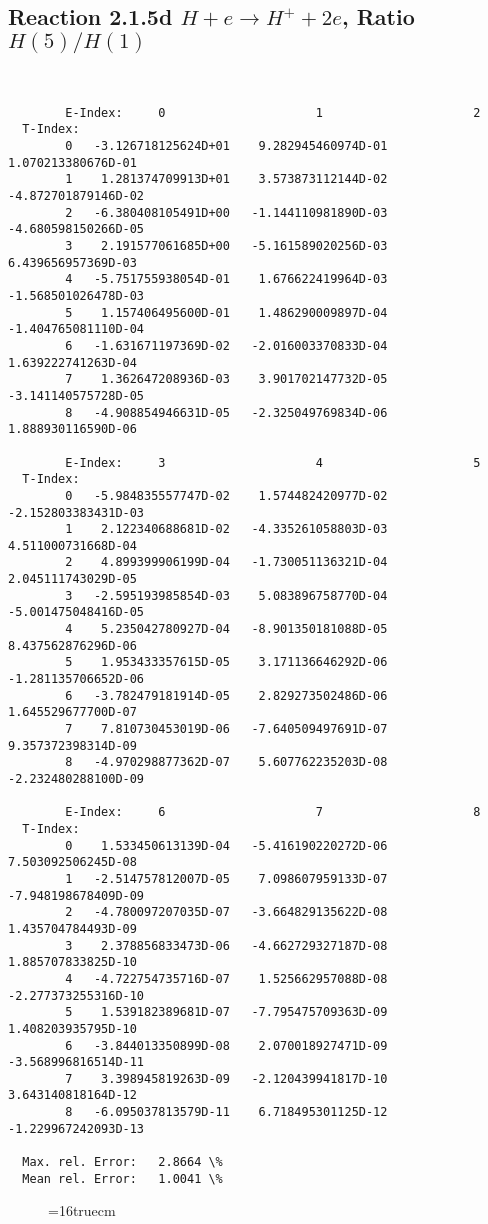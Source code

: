 \documentclass[12pt,dvipdfmx]{article}
\begin{document}
\newpage
\subsection{
Reaction 2.1.5d  $H + e \rightarrow H^+ + 2e$, Ratio $H(5)/H(1)$
}


\begin{small}\begin{verbatim}


        E-Index:     0                     1                     2
  T-Index:
        0   -3.126718125624D+01    9.282945460974D-01    1.070213380676D-01
        1    1.281374709913D+01    3.573873112144D-02   -4.872701879146D-02
        2   -6.380408105491D+00   -1.144110981890D-03   -4.680598150266D-05
        3    2.191577061685D+00   -5.161589020256D-03    6.439656957369D-03
        4   -5.751755938054D-01    1.676622419964D-03   -1.568501026478D-03
        5    1.157406495600D-01    1.486290009897D-04   -1.404765081110D-04
        6   -1.631671197369D-02   -2.016003370833D-04    1.639222741263D-04
        7    1.362647208936D-03    3.901702147732D-05   -3.141140575728D-05
        8   -4.908854946631D-05   -2.325049769834D-06    1.888930116590D-06

        E-Index:     3                     4                     5
  T-Index:
        0   -5.984835557747D-02    1.574482420977D-02   -2.152803383431D-03
        1    2.122340688681D-02   -4.335261058803D-03    4.511000731668D-04
        2    4.899399906199D-04   -1.730051136321D-04    2.045111743029D-05
        3   -2.595193985854D-03    5.083896758770D-04   -5.001475048416D-05
        4    5.235042780927D-04   -8.901350181088D-05    8.437562876296D-06
        5    1.953433357615D-05    3.171136646292D-06   -1.281135706652D-06
        6   -3.782479181914D-05    2.829273502486D-06    1.645529677700D-07
        7    7.810730453019D-06   -7.640509497691D-07    9.357372398314D-09
        8   -4.970298877362D-07    5.607762235203D-08   -2.232480288100D-09

        E-Index:     6                     7                     8
  T-Index:
        0    1.533450613139D-04   -5.416190220272D-06    7.503092506245D-08
        1   -2.514757812007D-05    7.098607959133D-07   -7.948198678409D-09
        2   -4.780097207035D-07   -3.664829135622D-08    1.435704784493D-09
        3    2.378856833473D-06   -4.662729327187D-08    1.885707833825D-10
        4   -4.722754735716D-07    1.525662957088D-08   -2.277373255316D-10
        5    1.539182389681D-07   -7.795475709363D-09    1.408203935795D-10
        6   -3.844013350899D-08    2.070018927471D-09   -3.568996816514D-11
        7    3.398945819263D-09   -2.120439941817D-10    3.643140818164D-12
        8   -6.095037813579D-11    6.718495301125D-12   -1.229967242093D-13

  Max. rel. Error:   2.8664 \%
  Mean rel. Error:   1.0041 \%

\end{verbatim}\end{small}
\begin{figure} \label{2.1.5d}
\epsfxsize=16truecm
\end{figure}
\end{document}
